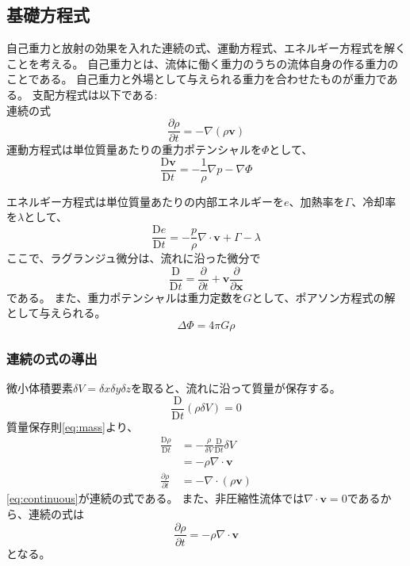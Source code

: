 \documentclass[a4j, dvipdfmx]{jsarticle}
\newcommand{\bx}{\mathbf{x}}
\newcommand{\bv}{\mathbf{v}}
\newcommand{\pder}[2][]{\frac{\partial#1}{\partial#2}}
\newcommand{\Dder}[2][]{\frac{\mathrm{D}#1}{\mathrm{D}#2}}
\newcommand{\beq}{\begin{equation}}
\newcommand{\eeq}{\end{equation}}
\begin{document}
\subsection{基礎方程式}
自己重力と放射の効果を入れた連続の式、運動方程式、エネルギー方程式を解くことを考える。
自己重力とは、流体に働く重力のうちの流体自身の作る重力のことである。
自己重力と外場として与えられる重力を合わせたものが重力である。
支配方程式は以下である:\\
連続の式
\begin{equation}
    \pder[\rho]{t} = - \nabla(\rho \bv)
\end{equation}
運動方程式は単位質量あたりの重力ポテンシャルを$\Phi$として、
\begin{equation}
    \Dder[\bv]{t} = - \frac{1}{\rho}\nabla{p} - \nabla\Phi\label{eq:euler}
\end{equation}

エネルギー方程式は単位質量あたりの内部エネルギーを$e$、加熱率を$\Gamma$、冷却率を$\lambda$として、
\begin{equation}
    \Dder[e]{t} = - \frac{p}{\rho} \nabla \cdot \bv + \Gamma - \lambda
\end{equation}
ここで、ラグランジュ微分は、流れに沿った微分で
\begin{equation}
    \Dder[]{t} = \pder[]{t} + \bv\pder[]{\bx}
\end{equation}
である。
また、重力ポテンシャルは重力定数を$G$として、ポアソン方程式の解として与えられる。
\beq
 \Delta \Phi = 4 \pi G \rho
\eeq
\subsubsection{連続の式の導出}
微小体積要素$\delta V = \delta x \delta y \delta z$を取ると、流れに沿って質量が保存する。
\begin{equation}
    \Dder[]{t} (\rho\delta V)= 0\label{eq:mass}
\end{equation}
質量保存則\eqref{eq:mass}より、
\begin{align}
    \Dder[\rho]{t} &= -\frac{\rho}{\delta V}\Dder[]{t} \delta V \\
     &= - \rho \nabla \cdot \bv\\
    \pder[\rho]{t} &= -  \nabla \cdot (\rho\bv)\label{eq:continuous}
\end{align}
\eqref{eq:continuous}が連続の式である。
また、非圧縮性流体では$\nabla \cdot \bv = 0$であるから、連続の式は
\begin{equation}
    \pder[\rho]{t} = -  \rho \nabla \cdot \bv
\end{equation}
となる。
\end{document}
